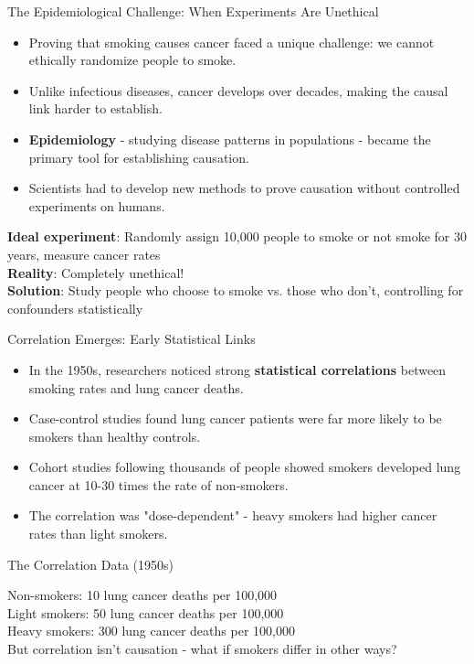 \documentclass{beamer}
\begin{document}
	
	\begin{frame}{The Epidemiological Challenge: When Experiments Are Unethical}
		\begin{itemize}
			\item Proving that smoking causes cancer faced a unique challenge: we cannot ethically randomize people to smoke.
			\item Unlike infectious diseases, cancer develops over decades, making the causal link harder to establish.
			\item \textbf{Epidemiology} - studying disease patterns in populations - became the primary tool for establishing causation.
			\item Scientists had to develop new methods to prove causation without controlled experiments on humans.
		\end{itemize}
		
		\begin{example}
			\textbf{Ideal experiment}: Randomly assign 10,000 people to smoke or not smoke for 30 years, measure cancer rates\\
			\textbf{Reality}: Completely unethical!\\
			\textbf{Solution}: Study people who choose to smoke vs. those who don't, controlling for confounders statistically
		\end{example}
	\end{frame}
	
	\begin{frame}{Correlation Emerges: Early Statistical Links}
		\begin{itemize}
			\item In the 1950s, researchers noticed strong \textbf{statistical correlations} between smoking rates and lung cancer deaths.
			\item Case-control studies found lung cancer patients were far more likely to be smokers than healthy controls.
			\item Cohort studies following thousands of people showed smokers developed lung cancer at 10-30 times the rate of non-smokers.
			\item The correlation was "dose-dependent" - heavy smokers had higher cancer rates than light smokers.
		\end{itemize}
		
		\begin{alertblock}{The Correlation Data (1950s)}
			\begin{center}
				Non-smokers: 10 lung cancer deaths per 100,000\\
				Light smokers: 50 lung cancer deaths per 100,000\\
				Heavy smokers: 300 lung cancer deaths per 100,000\\
				\vspace{0.2cm}
				But correlation isn't causation - what if smokers differ in other ways?
			\end{center}
		\end{alertblock}
	\end{frame}
	
\end{document}
